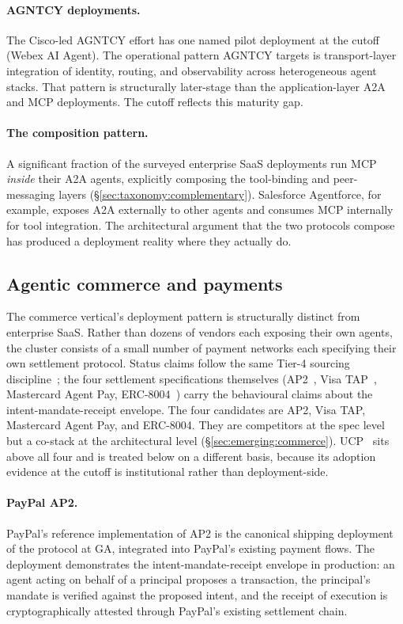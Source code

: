 \paragraph{AGNTCY deployments.}
The Cisco-led AGNTCY effort has one named pilot
deployment at the cutoff (Webex AI Agent). The
operational pattern AGNTCY targets is transport-layer
integration of identity, routing, and observability
across heterogeneous agent stacks. That pattern is
structurally later-stage than the application-layer A2A
and MCP deployments. The cutoff reflects this maturity gap.

\paragraph{The composition pattern.}
A significant fraction of the surveyed enterprise SaaS
deployments run MCP \emph{inside} their A2A agents,
explicitly composing the tool-binding and peer-messaging
layers (\S\ref{sec:taxonomy:complementary}). Salesforce
Agentforce, for example, exposes A2A externally to other
agents and consumes MCP internally for tool integration.
The architectural argument that the two protocols
compose has produced a deployment reality where they
actually do.

\subsection{Agentic commerce and payments}
\label{sec:adoption:commerce}

The commerce vertical's deployment pattern is structurally
distinct from enterprise SaaS. Rather than dozens of
vendors each exposing their own agents, the cluster
consists of a small number of payment networks each
specifying their own settlement protocol. Status claims
follow the same Tier-4 sourcing
discipline~\cite{vendor_announcements_2026}; the four
settlement specifications themselves
(AP2~\cite{spec_ap2}, Visa TAP~\cite{spec_visa_tap},
Mastercard Agent Pay, ERC-8004~\cite{spec_erc8004}) carry
the behavioural claims about the
intent-mandate-receipt envelope. The four
candidates are AP2, Visa TAP, Mastercard Agent Pay, and
ERC-8004. They are competitors at the spec level but a
co-stack at the architectural level
(\S\ref{sec:emerging:commerce}). UCP~\cite{spec_ucp} sits
above all four and is treated below on a different basis,
because its adoption evidence at the cutoff is institutional
rather than deployment-side.

\paragraph{PayPal AP2.}
PayPal's reference implementation of AP2 is the canonical
shipping deployment of the protocol at GA, integrated
into PayPal's existing payment flows. The deployment
demonstrates the intent-mandate-receipt envelope in
production: an agent acting on behalf of a principal
proposes a transaction, the principal's mandate is
verified against the proposed intent, and the receipt of
execution is cryptographically attested through PayPal's
existing settlement chain.

